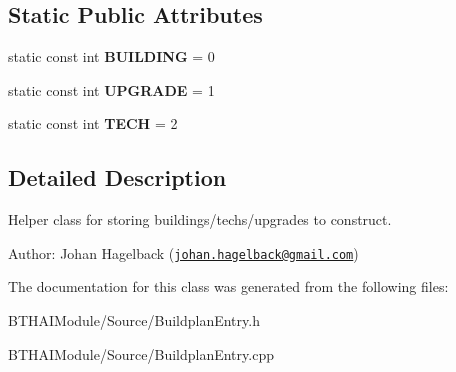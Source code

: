 \subsection*{Static Public Attributes}
\begin{DoxyCompactItemize}
\item 
\hypertarget{class_buildplan_entry_a95d92becb459699621cc3b29d27c7667}{static const int {\bfseries B\-U\-I\-L\-D\-I\-N\-G} = 0}\label{class_buildplan_entry_a95d92becb459699621cc3b29d27c7667}

\item 
\hypertarget{class_buildplan_entry_ae01abcb05feb89bddfffa7b2c3fa3636}{static const int {\bfseries U\-P\-G\-R\-A\-D\-E} = 1}\label{class_buildplan_entry_ae01abcb05feb89bddfffa7b2c3fa3636}

\item 
\hypertarget{class_buildplan_entry_a5e3c205c0540b10967ef7a3a28e2e5b8}{static const int {\bfseries T\-E\-C\-H} = 2}\label{class_buildplan_entry_a5e3c205c0540b10967ef7a3a28e2e5b8}

\end{DoxyCompactItemize}


\subsection{Detailed Description}
Helper class for storing buildings/techs/upgrades to construct.

Author\-: Johan Hagelback (\href{mailto:johan.hagelback@gmail.com}{\tt johan.\-hagelback@gmail.\-com}) 

The documentation for this class was generated from the following files\-:\begin{DoxyCompactItemize}
\item 
B\-T\-H\-A\-I\-Module/\-Source/Buildplan\-Entry.\-h\item 
B\-T\-H\-A\-I\-Module/\-Source/Buildplan\-Entry.\-cpp\end{DoxyCompactItemize}
